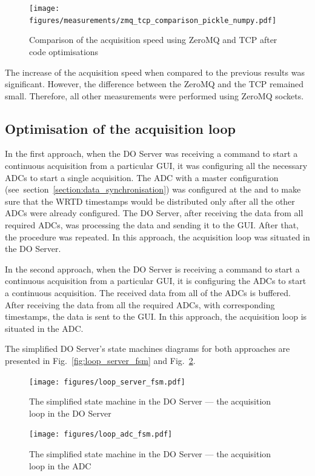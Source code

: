         \begin{figure}
        	\centerline{\texttt{[image: figures/measurements/zmq\_tcp\_comparison\_pickle\_numpy.pdf]}}
        	\caption{Comparison of the acquisition speed using ZeroMQ and TCP after code optimisations}
            	\label{fig:meas:zmq_tcp_comp_pikle_numpy}
        \end{figure}
        
        The increase of the acquisition speed when compared to the previous results was significant. However, the difference between the ZeroMQ and the TCP remained small. Therefore, all other measurements were performed using ZeroMQ sockets.
        
    \subsection{Optimisation of the acquisition loop} \label{section:acquisition_loop_opt}
        In the first approach,  when the DO Server was receiving a command to start a continuous acquisition from a particular GUI, it was configuring all the necessary ADCs to start a single acquisition. The ADC with a master configuration (see~section~\ref{section:data_synchronisation}) was configured at the and to make sure that the WRTD timestamps would be distributed only after all the other ADCs were already configured. The DO Server, after receiving the data from all required ADCs, was processing the data and sending it to the GUI. After that, the procedure was repeated. In this approach, the acquisition loop was situated in the DO Server.
        
        In the second approach, when the DO Server is receiving a command to start a continuous acquisition from a particular GUI, it is configuring the ADCs to start a continuous acquisition. The received data from all of the ADCs is buffered. After receiving the data from all the required ADCs, with corresponding timestamps, the data is sent to the GUI. In this approach, the acquisition loop is situated in the ADC.
        
        The simplified DO Server's state machines diagrams for both approaches are presented in Fig.~\ref{fig:loop_server_fsm} and Fig.~\ref{fig:loop_adc_fsm}.
        
        \begin{figure}
            \centering
            \begin{minipage}[b]{0.45\textwidth}
            	\texttt{[image: figures/loop\_server\_fsm.pdf]}
            	\caption{The simplified state machine in the DO Server --- the acquisition loop in the DO Server}
                \label{fig:loop_server_fsm}
            \end{minipage}
            \hfill
            \begin{minipage}[b]{0.45\textwidth}
            	\texttt{[image: figures/loop\_adc\_fsm.pdf]}
            	\caption{The simplified state machine in the DO Server --- the acquisition loop in the ADC}
                \label{fig:loop_adc_fsm}
            \end{minipage}

        \end{figure}
        
